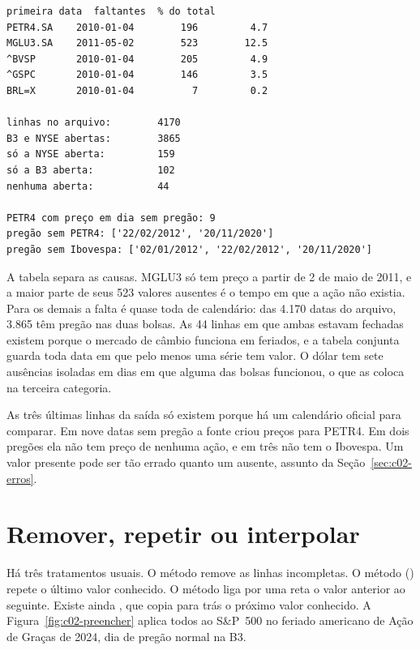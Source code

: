 
\begin{lstlisting}[style=saida]
         primeira data  faltantes  % do total
PETR4.SA    2010-01-04        196         4.7
MGLU3.SA    2011-05-02        523        12.5
^BVSP       2010-01-04        205         4.9
^GSPC       2010-01-04        146         3.5
BRL=X       2010-01-04          7         0.2

linhas no arquivo:        4170
B3 e NYSE abertas:        3865
só a NYSE aberta:         159
só a B3 aberta:           102
nenhuma aberta:           44

PETR4 com preço em dia sem pregão: 9
pregão sem PETR4: ['22/02/2012', '20/11/2020']
pregão sem Ibovespa: ['02/01/2012', '22/02/2012', '20/11/2020']
\end{lstlisting}

A tabela separa as causas. MGLU3 só tem preço a partir de 2 de maio de 2011, e a maior parte de seus 523 valores ausentes é o tempo em que a ação não existia. Para os demais a falta é quase toda de calendário: das 4.170 datas do arquivo, 3.865 têm pregão nas duas bolsas. As 44 linhas em que ambas estavam fechadas existem porque o mercado de câmbio funciona em feriados, e a tabela conjunta guarda toda data em que pelo menos uma série tem valor. O dólar tem sete ausências isoladas em dias em que alguma das bolsas funcionou, o que as coloca na terceira categoria.

As três últimas linhas da saída só existem porque há um calendário oficial para comparar. Em nove datas sem pregão a fonte criou preços para PETR4. Em dois pregões ela não tem preço de nenhuma ação, e em três não tem o Ibovespa. Um valor presente pode ser tão errado quanto um ausente, assunto da Seção~\ref{sec:c02-erros}.

\section{Remover, repetir ou interpolar}
\label{sec:c02-tratar}

Há três tratamentos usuais. O método  remove as linhas incompletas. O método  () repete o último valor conhecido. O método  liga por uma reta o valor anterior ao seguinte. Existe ainda , que copia para trás o próximo valor conhecido. A Figura~\ref{fig:c02-preencher} aplica todos ao S\&P~500 no feriado americano de Ação de Graças de 2024, dia de pregão normal na B3.

